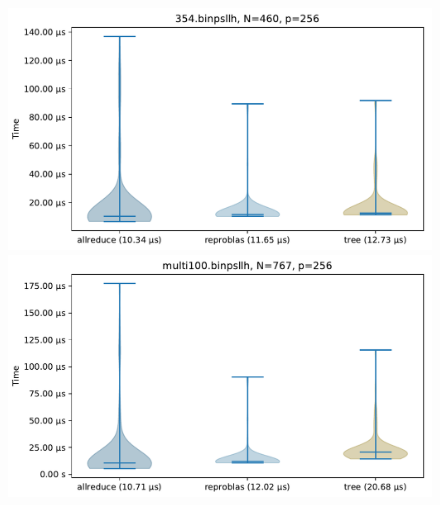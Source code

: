 \newcommand{\mScale}{0.7}
\begin{figure}\centering
\includegraphics[scale=\mScale]{figures/violin354.pdf}
\includegraphics[scale=\mScale]{figures/violinMulti100.pdf}

\end{figure}
